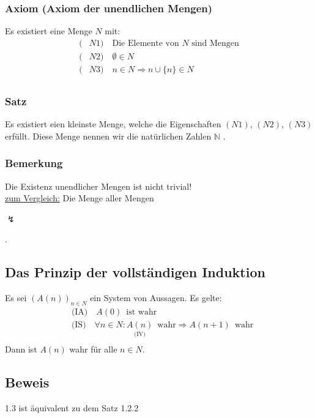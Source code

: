 \subsubsection{Axiom (Axiom der unendlichen Mengen)}
Es existiert eine Menge \(N\) mit:
\begin{align*}
(&N1) \quad \text{Die Elemente von \(N\) sind Mengen} \\
(&N2) \quad \emptyset \in N \\
(&N3) \quad n \in N \Longrightarrow n \cup \{n\} \in N \\
\end{align*}
\subsubsection{Satz}
Es existiert eien kleinste Menge, welche die Eigenschaften \((N1)\), \((N2)\), \((N3)\) erfüllt. Diese Menge nennen wir die natürlichen Zahlen \( \mathbb{N}\) .
\subsubsection{Bemerkung}
Die Existenz unendlicher Mengen ist nicht trivial! \\
\underline{zum Vergleich:} Die Menge aller Mengen \begin{Large} \( \lightning \) \end{Large}.

\subsection{Das Prinzip der vollständigen Induktion}
Es sei \( (A(n))_{n \in N} \) ein System von Aussagen. Es gelte:
\begin{align*}
&\text{(IA)} \quad A(0) \enspace \text{ist wahr} \\
&\text{(IS)} \quad \forall n \in N : \underset{\text{(IV)}}{A(n)} \enspace \text{wahr} \Longrightarrow A (n+1) \enspace \text{wahr} \\
\end{align*} Dann ist \(A(n)\) wahr für alle \(n \in N \).

\subsection{Beweis} 1.3 ist äquivalent zu dem Satz 1.2.2

